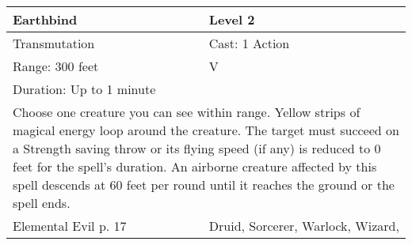 \documentclass[11pt]{report}
\begin{document}
\begin{table}[H]
	\begin{tabular}{||p{6cm}|p{6cm}||}
		\hline\hline
		\bf{Earthbind} & Level 2\\ \hline
		Transmutation & Cast: 1 Action\\ \hline
		Range: 300 feet & V\\ \hline
		Duration: Up to 1 minute & \\ \hline
		\multicolumn{2}{||p{12cm}||}{Choose one creature you can see within range. Yellow strips of magical energy loop around the creature. The target must succeed on a Strength saving throw or its flying speed (if any) is reduced to 0 feet for the spell’s duration. An airborne creature affected by this spell descends at 60 feet per round until it reaches the ground or the spell ends.}\\ \hline
Elemental Evil p. 17 & Druid, Sorcerer, Warlock, Wizard, \\ \hline\hline
	\end{tabular}
\end{table}
\end{document}
